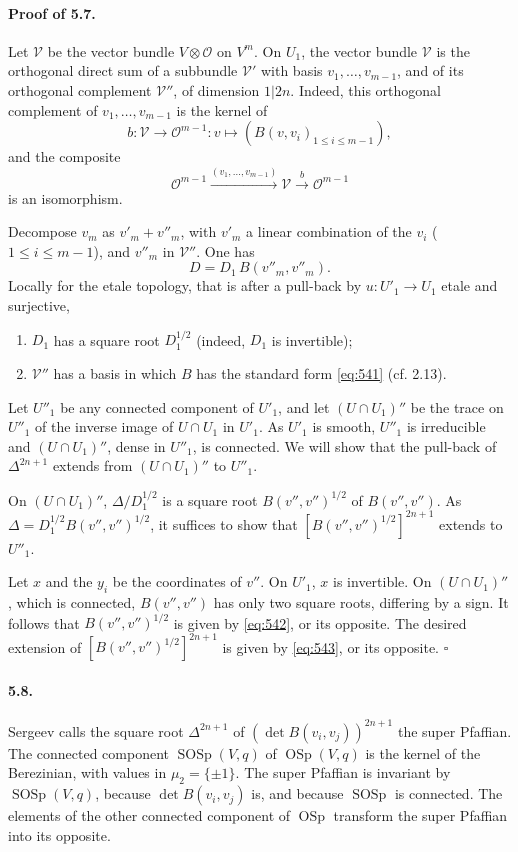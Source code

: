 \documentclass[11pt]{article}
\newcommand{\OSp}{\operatorname{OSp}}
\newcommand{\SOSp}{\operatorname{SOSp}}
\newcommand{\calO}{\mathcal O}
\begin{document}
\paragraph{Proof of 5.7.}
Let $\mathcal V$ be the vector bundle $V\otimes\calO$ on $V^m$. On $U_1$, the vector bundle $\mathcal V$ is the orthogonal direct sum of a subbundle $\mathcal V'$ with basis $v_1,\ldots,v_{m-1}$, and of its orthogonal complement $\mathcal V''$, of dimension $1|2n$. Indeed, this orthogonal complement of $v_1,\ldots,v_{m-1}$ is the kernel of
\[
b:\mathcal V\longrightarrow \calO^{m-1}:v\longmapsto(B(v,v_i)_{1\leq i\leq m-1}),
\]
and the composite
\[
\calO^{m-1}\xrightarrow{(v_1,\ldots,v_{m-1})}\mathcal V\xrightarrow{b}\calO^{m-1}
\]
is an isomorphism.

Decompose $v_m$ as $v'_m+v''_m$, with $v'_m$ a linear combination of the $v_i$ ($1\leq i\leq m-1$), and $v''_m$ in $\mathcal V''$. One has
\[
D=D_1\,B(v''_m,v''_m).
\]
Locally for the etale topology, that is after a pull-back by $u:U'_1\to U_1$ etale and surjective,
\begin{enumerate}[label=(\alph*)]
\item $D_1$ has a square root $D_1^{1/2}$ (indeed, $D_1$ is invertible);
\item $\mathcal V''$ has a basis in which $B$ has the standard form \eqref{eq:541} (cf. 2.13).
\end{enumerate}
Let $U''_1$ be any connected component of $U'_1$, and let $(U\cap U_1)''$ be the trace on $U''_1$ of the inverse image of $U\cap U_1$ in $U'_1$. As $U'_1$ is smooth, $U''_1$ is irreducible and $(U\cap U_1)''$, dense in $U''_1$, is connected. We will show that the pull-back of $\Delta^{2n+1}$ extends from $(U\cap U_1)''$ to $U''_1$.

On $(U\cap U_1)''$, $\Delta/D_1^{1/2}$ is a square root $B(v'',v'')^{1/2}$ of $B(v'',v'')$. As $\Delta=D_1^{1/2}B(v'',v'')^{1/2}$, it suffices to show that $[B(v'',v'')^{1/2}]^{2n+1}$ extends to $U''_1$.

Let $x$ and the $y_i$ be the coordinates of $v''$. On $U'_1$, $x$ is invertible. On $(U\cap U_1)''$, which is connected, $B(v'',v'')$ has only two square roots, differing by a sign. It follows that $B(v'',v'')^{1/2}$ is given by \eqref{eq:542}, or its opposite. The desired extension of $[B(v'',v'')^{1/2}]^{2n+1}$ is given by \eqref{eq:543}, or its opposite. \hfill $\square$

\paragraph{5.8.}
Sergeev calls the square root $\Delta^{2n+1}$ of $(\det B(v_i,v_j))^{2n+1}$ the super Pfaffian. The connected component $\SOSp(V,q)$ of $\OSp(V,q)$ is the kernel of the Berezinian, with values in $\mu_2=\{\pm1\}$. The super Pfaffian is invariant by $\SOSp(V,q)$, because $\det B(v_i,v_j)$ is, and because $\SOSp$ is connected. The elements of the other connected component of $\OSp$ transform the super Pfaffian into its opposite.
\end{document}
